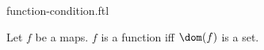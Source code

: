 \documentclass{stex}
\begin{document}
\begin{smodule}{function-condition.ftl}


\begin{fakeforthel}
  \begin{axiom}
    Let $f$ be a maps.
    $f$ is a function iff $\dom(f)$ is a set.
  \end{axiom}
\end{fakeforthel}

\end{smodule}
\end{document}

